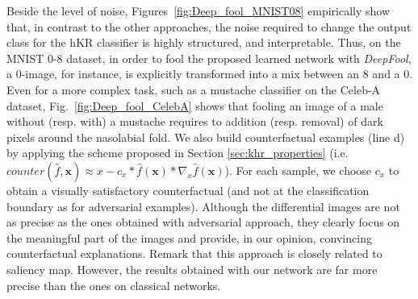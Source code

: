 \documentclass{article}
\begin{document}
Beside the level of noise, Figures~\ref{fig:Deep_fool_MNIST08} empirically show that, in contrast to the other approaches, the noise required to change the output class for the hKR classifier is highly structured, and interpretable. Thus, on the MNIST 0-8 dataset, in order to fool the proposed  learned network with \textit{DeepFool}, a 0-image, for instance, is explicitly transformed into a mix between an 8 and a 0. Even for a more complex task, such as a mustache classifier on the Celeb-A dataset, Fig.~\ref{fig:Deep_fool_CelebA} shows that fooling an image of a male without (resp. with) a mustache requires to addition (resp. removal) of dark pixels around the nasolabial fold. We also build counterfactual examples (line d) by applying the scheme proposed in Section \ref{sec:khr_properties}  (i.e. $counter(\hat{f},\textbf{x})\approx x-c_x*\hat{f}(\textbf{x})*\nabla_x \hat{f}(\textbf{x})$). For each sample, we choose $c_x$ to obtain a visually satisfactory counterfactual (and not at the classification boundary as for adversarial examples). Although the differential images are not as precise as the ones obtained with adversarial approach, they clearly focus on the meaningful part of the images and provide, in our opinion, convincing counterfactual explanations. Remark that this approach is closely related to saliency map. However, the results obtained with our network are far more precise than the ones on classical networks.   %

\end{document}
